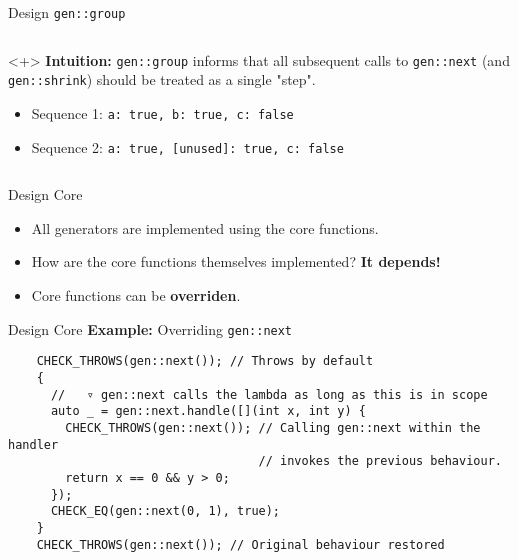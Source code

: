 \begin{frame}[fragile,t]{\halcheck{} \textemdash{} Design \textemdash{} \texttt{gen::group}}
\begin{columns}[T]
    \begin{onlyenv}<+>
      \textbf{Intuition:} \texttt{gen::group} informs \halcheck{} that all subsequent calls to \texttt{gen::next} (and \texttt{gen::shrink}) should be treated as a single "step".

      \begin{itemize}
        \item Sequence 1: \texttt{{{a: true, b: true}, c: false}}
        \item Sequence 2: \texttt{{{a: true, [unused]: true}, c: false}}
      \end{itemize}
    \end{onlyenv}
  \end{columns}
\end{frame}

\begin{frame}[fragile]{\halcheck{} \textemdash{} Design \textemdash{} Core}
  \begin{itemize}
    \item All generators are implemented using the core functions.
          \pause{}
    \item How are the core functions themselves implemented?
          \pause\textbf{It depends!}
    \item Core functions can be \textbf{overriden}.
  \end{itemize}
\end{frame}

\begin{frame}[fragile]{\halcheck{} \textemdash{} Design \textemdash{} Core}
  \textbf{Example:} Overriding \texttt{gen::next}
  \begin{verbatim}
    CHECK_THROWS(gen::next()); // Throws by default
    {
      //   ▿ gen::next calls the lambda as long as this is in scope
      auto _ = gen::next.handle([](int x, int y) {
        CHECK_THROWS(gen::next()); // Calling gen::next within the handler
                                   // invokes the previous behaviour.
        return x == 0 && y > 0;
      });
      CHECK_EQ(gen::next(0, 1), true);
    }
    CHECK_THROWS(gen::next()); // Original behaviour restored
  \end{verbatim}
\end{frame}

